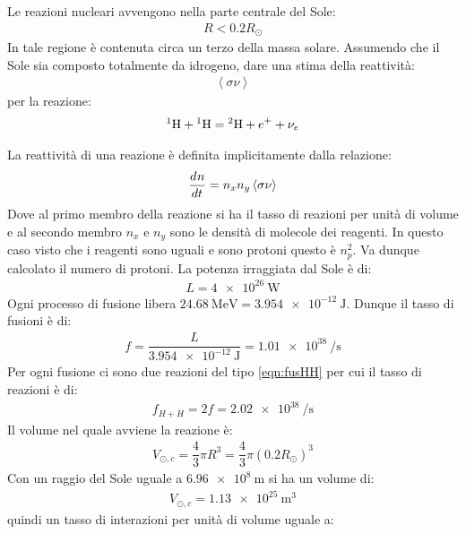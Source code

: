\documentclass[../main.tex]{subfiles}
\begin{document}
	\begin{ese}[10.2]
	Le reazioni nucleari avvengono nella parte centrale del Sole:
	\begin{gather}
	R<0.2R_{\odot}
	\end{gather}
	In tale regione è contenuta circa un terzo della massa solare. Assumendo che il Sole sia composto totalmente da idrogeno, dare una stima della reattività:
	\begin{gather*}
	\left<\sigma\nu\right> 
	\end{gather*}
	per la reazione:
	\begin{gather}
	\label{eqn:fusHH}
	\chem{^{1}H}+\chem{^{1}H}=\chem{^{2}H}+e^{+}+\nu_{e}
	\end{gather}
\end{ese}
\begin{svol}
	La reattività di una reazione è definita implicitamente dalla relazione:
	\begin{gather}
		\der[]{n}{t}=n_{x}n_{y}\left<\sigma\nu\right> 
	\end{gather}
	Dove al primo membro della reazione si ha il tasso di reazioni per unità di volume e al secondo membro $ n_{x} $ e $ n_{y} $ sono le densità di molecole dei reagenti. In questo caso visto che i reagenti sono uguali e sono protoni questo è $ n_{p}^{2} $. Va dunque calcolato il numero di protoni. La potenza irraggiata dal Sole è di:
	\begin{gather*}
	L=\SI{4e26}{\watt}
	\end{gather*}
	Ogni processo di fusione libera $ \SI{24.68}{\mega\electronvolt}=	\SI{3.954e-12}{\joule} $. Dunque il tasso di fusioni è di:
	\begin{gather*}
	f=\dfrac{L}{\SI{3.954e-12}{\joule}}=\SI{1.01e38}{\per\second}
	\end{gather*}
	Per ogni fusione ci sono due reazioni del tipo \ref{eqn:fusHH} per cui il tasso di reazioni è di:
	\begin{gather}
		f_{H+H}=2f=\SI{2.02e38}{\per\second}
	\end{gather}
	Il volume nel quale avviene la reazione è:
	\begin{gather}
		V_{\odot,c}=\dfrac{4}{3}\pi R^{3}=\dfrac{4}{3}\pi (0.2R_{\odot})^{3}
	\end{gather}
	Con un raggio del Sole uguale a $ \SI{6.96e8}{\meter} $ si ha un volume di:
	\begin{gather}
		V_{\odot,c}=\SI{1.13e25}{\meter\cubed}
	\end{gather}
	quindi un tasso di interazioni per unità di volume uguale a:

\end{svol}
\end{document}
